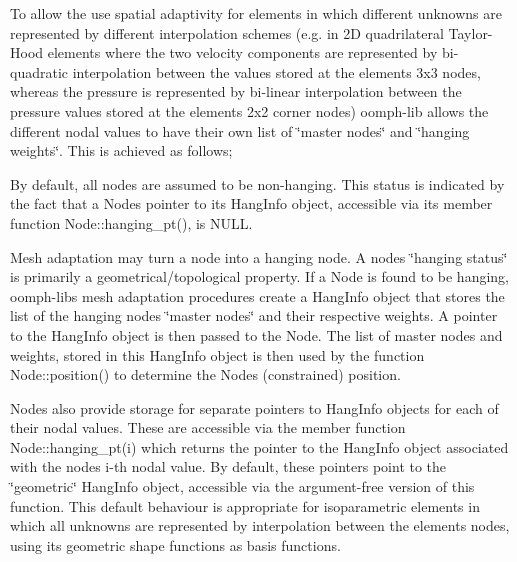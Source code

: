To allow the use spatial adaptivity for elements in which different unknowns are represented by different interpolation schemes (e.\+g. in 2D quadrilateral Taylor-\/\+Hood elements where the two velocity components are represented by bi-\/quadratic interpolation between the values stored at the element\textquotesingle{}s 3x3 nodes, whereas the pressure is represented by bi-\/linear interpolation between the pressure values stored at the element\textquotesingle{}s 2x2 corner nodes) {\ttfamily oomph-\/lib} allows the different nodal values to have their own list of \char`\"{}master nodes\char`\"{} and \char`\"{}hanging weights\char`\"{}. This is achieved as follows;
\begin{DoxyItemize}
\item By default, all nodes are assumed to be non-\/hanging. This status is indicated by the fact that a {\ttfamily Node\textquotesingle{}s} pointer to its {\ttfamily Hang\+Info} object, accessible via its member function {\ttfamily Node\+::hanging\+\_\+pt()}, is {\ttfamily N\+U\+LL}.
\item Mesh adaptation may turn a node into a hanging node. A node\textquotesingle{}s \char`\"{}hanging status\char`\"{} is primarily a geometrical/topological property. If a {\ttfamily Node} is found to be hanging, {\ttfamily oomph-\/lib\textquotesingle{}s} mesh adaptation procedures create a {\ttfamily Hang\+Info} object that stores the list of the hanging node\textquotesingle{}s \char`\"{}master nodes\char`\"{} and their respective weights. A pointer to the {\ttfamily Hang\+Info} object is then passed to the {\ttfamily Node}. The list of master nodes and weights, stored in this {\ttfamily Hang\+Info} object is then used by the function {\ttfamily Node\+::position()} to determine the {\ttfamily Node\textquotesingle{}s} (constrained) position.
\item Nodes also provide storage for separate pointers to {\ttfamily Hang\+Info} objects for each of their nodal values. These are accessible via the member function {\ttfamily Node\+::hanging\+\_\+pt(i)} which returns the pointer to the {\ttfamily Hang\+Info} object associated with the node\textquotesingle{}s i-\/th nodal value. By default, these pointers point to the \char`\"{}geometric\char`\"{} {\ttfamily Hang\+Info} object, accessible via the argument-\/free version of this function. This default behaviour is appropriate for isoparametric elements in which all unknowns are represented by interpolation between the elements\textquotesingle{} nodes, using its geometric shape functions as basis functions.

\end{DoxyItemize}
